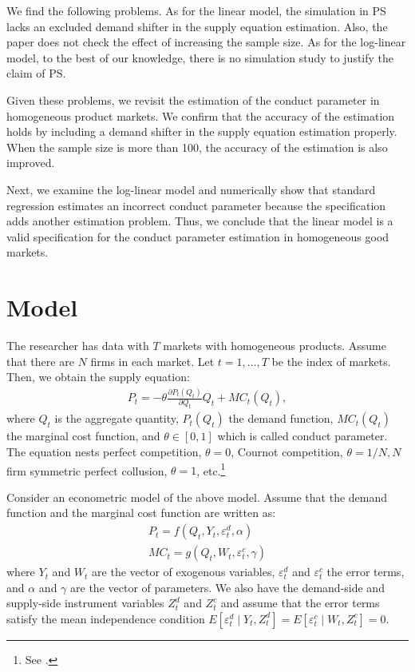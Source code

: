 \documentclass[11pt, a4paper]{article}
\begin{document}
We find the following problems.
As for the linear model, the simulation in PS lacks an excluded demand shifter in the supply equation estimation. 
Also, the paper does not check the effect of increasing the sample size. 
As for the log-linear model, to the best of our knowledge, there is no simulation study to justify the claim of PS.

Given these problems, we revisit the estimation of the conduct parameter in homogeneous product markets.
We confirm that the accuracy of the estimation holds by including a demand shifter in the supply equation estimation properly. 
When the sample size is more than 100, the accuracy of the estimation is also improved.

Next, we examine the log-linear model and numerically show that standard regression estimates an incorrect conduct parameter because the specification adds another estimation problem.
Thus, we conclude that the linear model is a valid specification for the conduct parameter estimation in homogeneous good markets.



\section{Model}
The researcher has data with $T$ markets with homogeneous products.
Assume that there are $N$ firms in each market.
Let $t = 1,\ldots, T$ be the index of markets.
Then, we obtain the supply equation:
\begin{align}
     P_t = -\theta\frac{\partial P_t(Q_t)}{\partial Q_t}Q_t + MC_t(Q_t),\label{eq:supply_equation}
\end{align}
where $Q_t$ is the aggregate quantity, $P_t(Q_{t})$ the demand function, $MC_{t}(Q_{t})$ the marginal cost function, and $\theta\in[0,1]$ which is called conduct parameter. 
The equation nests perfect competition, $\theta=0$, Cournot competition, $\theta=1/N, N$ firm symmetric perfect collusion, $\theta=1$, etc.\footnote{See \cite{bresnahan1982oligopoly}.} 

Consider an econometric model of the above model.
Assume that the demand function and the marginal cost function are written as: 
\begin{align}
    P_t = f(Q_t, Y_t, \varepsilon^{d}_{t}, \alpha) \label{eq:demand}\\
    MC_t = g(Q_t, W_{t}, \varepsilon^{c}_{t}, \gamma)\label{eq:marginal_cost}
\end{align}
where $Y_t$ and $W_{t}$ are the vector of exogenous variables, $\varepsilon^{d}_{t}$ and $\varepsilon^{c}_{t}$ the error terms, and $\alpha$ and $\gamma$ are the vector of parameters.
We also have the demand-side and supply-side instrument variables $Z^{d}_{t}$ and $Z^{c}_{t}$ and assume that the error terms satisfy the mean independence condition $E[\varepsilon^{d}_{t}\mid Y_t, Z^{d}_{t}] = E[\varepsilon^{c}_{t} \mid W_{t}, Z^{c}_{t}] =0$.
\end{document}
